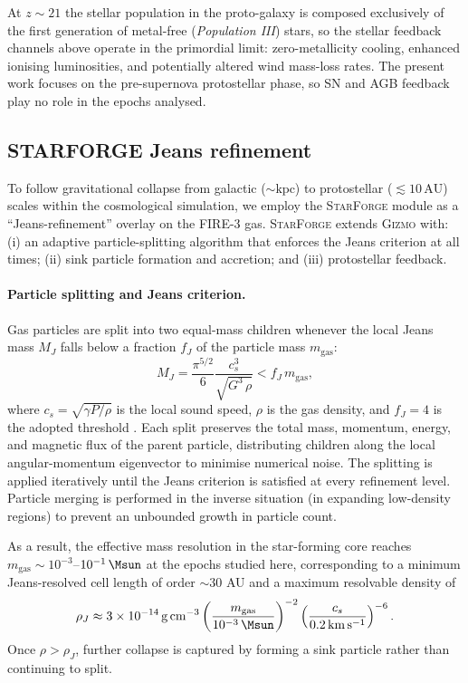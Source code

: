 At $z\sim 21$ the stellar population in the proto-galaxy is composed
exclusively of the first generation of metal-free (\textit{Population III})
stars, so the stellar feedback channels above operate in the primordial
limit: zero-metallicity cooling, enhanced ionising luminosities, and
potentially altered wind mass-loss rates.  The present work focuses on the
pre-supernova protostellar phase, so SN and AGB feedback play no role in
the epochs analysed.

\subsection{STARFORGE Jeans refinement}
\label{sec:jeans}

To follow gravitational collapse from galactic ($\sim\mathrm{kpc}$) to
protostellar ($\lesssim10\,\mathrm{AU}$) scales within the cosmological
simulation, we employ the \textsc{StarForge} module \citep{Grudic2021,
Grudic2022} as a ``Jeans-refinement'' overlay on the FIRE-3 gas.
\textsc{StarForge} extends \textsc{Gizmo} with:
(i) an adaptive particle-splitting algorithm that enforces the Jeans
criterion at all times;
(ii) sink particle formation and accretion;
and (iii) protostellar feedback.

\paragraph{Particle splitting and Jeans criterion.}
Gas particles are split into two equal-mass children whenever the
local Jeans mass $M_J$ falls below a fraction $f_J$ of the particle
mass $m_\mathrm{gas}$:
\begin{equation}
    M_J = \frac{\pi^{5/2}}{6}\frac{c_s^3}{\sqrt{G^3\,\rho}}
    < f_J\,m_\mathrm{gas},
\end{equation}
where $c_s = \sqrt{\gamma P/\rho}$ is the local sound speed, $\rho$ is the
gas density, and $f_J = 4$ is the adopted threshold
\citep{Grudic2021}.  Each split preserves the total mass, momentum,
energy, and magnetic flux of the parent particle, distributing children along
the local angular-momentum eigenvector to minimise numerical noise.  The
splitting is applied iteratively until the Jeans criterion is satisfied at
every refinement level.  Particle merging is performed in the inverse
situation (in expanding low-density regions) to prevent an unbounded growth
in particle count.

As a result, the effective mass resolution in the star-forming core reaches
$m_\mathrm{gas}\sim 10^{-3}$--$10^{-1}\,\Msun$ at the epochs studied here,
corresponding to a minimum Jeans-resolved cell length of order $\sim 30$
AU and a maximum resolvable density of
\begin{equation}
    \rho_J \approx 3\times10^{-14}\,\mathrm{g\,cm^{-3}}
    \left(\frac{m_\mathrm{gas}}{10^{-3}\,\Msun}\right)^{-2}
    \left(\frac{c_s}{0.2\,\mathrm{km\,s^{-1}}}\right)^{-6}.
    \label{eq:rhoJ}
\end{equation}
Once $\rho > \rho_J$, further collapse is captured by forming a sink
particle rather than continuing to split.

